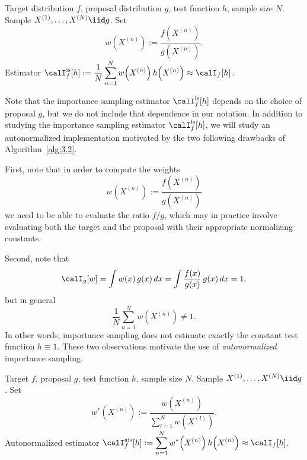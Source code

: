\begin{algorithm}[H]
\caption{Importance Sampling}
\label{alg:3.2}
\begin{algorithmic}[1]
\Require Target distribution $f$, proposal distribution $g$, test function $h$,
         sample size $N$.
\State Sample $X^{(1)}, \ldots, X^{(N)} \iid g$.
\State Set
  \[
    w\!\left(X^{(n)}\right) := \frac{f\!\left(X^{(n)}\right)}{g\!\left(X^{(n)}\right)}.
  \]
\Ensure Estimator
  $\calI_f^{\mathrm{is}}[h] := \dfrac{1}{N}\displaystyle\sum_{n=1}^{N}
   w\!\left(X^{(n)}\right) h\!\left(X^{(n)}\right) \approx \calI_f[h]$.
\end{algorithmic}
\end{algorithm}

Note that the importance sampling estimator $\calI_f^{\mathrm{is}}[h]$ depends
on the choice of proposal $g$, but we do not include that dependence in our
notation. In addition to studying the importance sampling estimator
$\calI_f^{\mathrm{is}}[h]$, we will study an autonormalized implementation
motivated by the two following drawbacks of Algorithm~\ref{alg:3.2}.

First, note that in order to compute the weights
\[
  w\!\left(X^{(n)}\right) := \frac{f\!\left(X^{(n)}\right)}{g\!\left(X^{(n)}\right)}
\]
we need to be able to evaluate the ratio $f/g$, which may in practice involve
evaluating both the target and the proposal with their appropriate normalizing
constants.

Second, note that
\[
  \calI_g[w]
  = \int w(x)\,g(x)\,dx
  = \int \frac{f(x)}{g(x)}\,g(x)\,dx
  = 1,
\]
but in general
\[
  \frac{1}{N}\sum_{n=1}^{N} w\!\left(X^{(n)}\right) \neq 1.
\]
In other words, importance sampling does not estimate exactly the constant test
function $h \equiv 1$. These two observations motivate the use of
\emph{autonormalized} importance sampling.

\begin{algorithm}[H]
\caption{Autonormalized Importance Sampling}
\label{alg:3.3}
\begin{algorithmic}[1]
\Require Target $f$, proposal $g$, test function $h$, sample size $N$.
\State Sample $X^{(1)}, \ldots, X^{(N)} \iid g$.
\State Set
  \[
    w^*\!\left(X^{(n)}\right)
    := \frac{w\!\left(X^{(n)}\right)}{\displaystyle\sum_{l=1}^{N} w\!\left(X^{(l)}\right)}.
  \]
\Ensure Autonormalized estimator
  $\calI_f^{\mathrm{ais}}[h]
   := \displaystyle\sum_{n=1}^{N}
      w^*\!\left(X^{(n)}\right) h\!\left(X^{(n)}\right)
   \approx \calI_f[h]$.
\end{algorithmic}
\end{algorithm}

